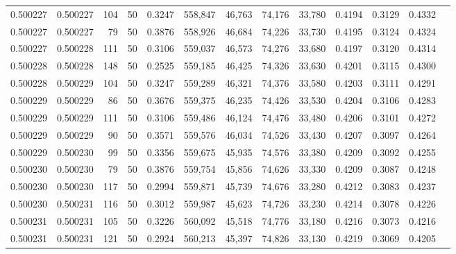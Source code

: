 \begin{tabular}{rrrrrrrrrrrrr}
0.500227 & 0.500227 &   104 &  50 &                                     0.3247 & 558,847 &  46,763 &  74,176 &  33,780 & 0.4194 & 0.3129 & 0.4332 \\
0.500227 & 0.500227 &    79 &  50 &                                     0.3876 & 558,926 &  46,684 &  74,226 &  33,730 & 0.4195 & 0.3124 & 0.4324 \\
0.500227 & 0.500228 &   111 &  50 &                                     0.3106 & 559,037 &  46,573 &  74,276 &  33,680 & 0.4197 & 0.3120 & 0.4314 \\
0.500228 & 0.500228 &   148 &  50 &                                     0.2525 & 559,185 &  46,425 &  74,326 &  33,630 & 0.4201 & 0.3115 & 0.4300 \\
0.500228 & 0.500229 &   104 &  50 &                                     0.3247 & 559,289 &  46,321 &  74,376 &  33,580 & 0.4203 & 0.3111 & 0.4291 \\
0.500229 & 0.500229 &    86 &  50 &                                     0.3676 & 559,375 &  46,235 &  74,426 &  33,530 & 0.4204 & 0.3106 & 0.4283 \\
0.500229 & 0.500229 &   111 &  50 &                                     0.3106 & 559,486 &  46,124 &  74,476 &  33,480 & 0.4206 & 0.3101 & 0.4272 \\
0.500229 & 0.500229 &    90 &  50 &                                     0.3571 & 559,576 &  46,034 &  74,526 &  33,430 & 0.4207 & 0.3097 & 0.4264 \\
0.500229 & 0.500230 &    99 &  50 &                                     0.3356 & 559,675 &  45,935 &  74,576 &  33,380 & 0.4209 & 0.3092 & 0.4255 \\
0.500230 & 0.500230 &    79 &  50 &                                     0.3876 & 559,754 &  45,856 &  74,626 &  33,330 & 0.4209 & 0.3087 & 0.4248 \\
0.500230 & 0.500230 &   117 &  50 &                                     0.2994 & 559,871 &  45,739 &  74,676 &  33,280 & 0.4212 & 0.3083 & 0.4237 \\
0.500230 & 0.500231 &   116 &  50 &                                     0.3012 & 559,987 &  45,623 &  74,726 &  33,230 & 0.4214 & 0.3078 & 0.4226 \\
0.500231 & 0.500231 &   105 &  50 &                                     0.3226 & 560,092 &  45,518 &  74,776 &  33,180 & 0.4216 & 0.3073 & 0.4216 \\
0.500231 & 0.500231 &   121 &  50 &                                     0.2924 & 560,213 &  45,397 &  74,826 &  33,130 & 0.4219 & 0.3069 & 0.4205 \\

\end{tabular}
